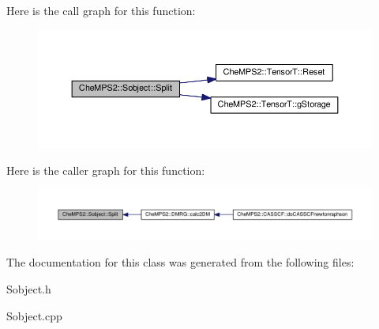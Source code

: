 Here is the call graph for this function\-:\nopagebreak
\begin{figure}[H]
\begin{center}
\leavevmode
\includegraphics[width=350pt]{classCheMPS2_1_1Sobject_a34983e86ae9f19de0be6b923479c13df_cgraph}
\end{center}
\end{figure}




Here is the caller graph for this function\-:\nopagebreak
\begin{figure}[H]
\begin{center}
\leavevmode
\includegraphics[width=350pt]{classCheMPS2_1_1Sobject_a34983e86ae9f19de0be6b923479c13df_icgraph}
\end{center}
\end{figure}




The documentation for this class was generated from the following files\-:\begin{DoxyCompactItemize}
\item 
Sobject.\-h\item 
Sobject.\-cpp\end{DoxyCompactItemize}
